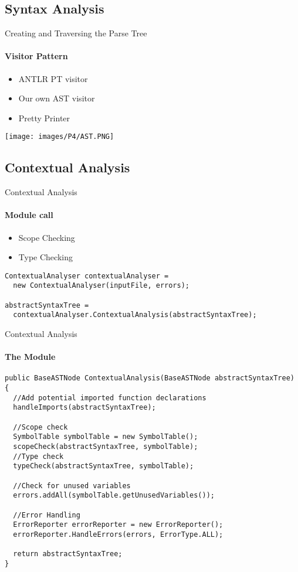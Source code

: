 \subsection{Syntax Analysis}
\begin{frame}{Creating and Traversing the Parse Tree}
\framesubtitle{Visitor Pattern}
	\begin{itemize}
        \item ANTLR PT visitor
        \item Our own AST visitor
        \item Pretty Printer
    \end{itemize}
    \texttt{[image: images/P4/AST.PNG]}

\end{frame}

\subsection{Contextual Analysis}
\begin{frame}[fragile,t]{Contextual Analysis}
\framesubtitle{Module call}
\begin{itemize}
  \item Scope Checking
  \item Type Checking
\end{itemize}
\begin{lstlisting}[caption=The creation of an instance of the Contextual analysis module and the call invoking it. ,frame=tlrb, basicstyle=\tiny, numbers=none]
ContextualAnalyser contextualAnalyser = 
  new ContextualAnalyser(inputFile, errors);

abstractSyntaxTree = 
  contextualAnalyser.ContextualAnalysis(abstractSyntaxTree);
\end{lstlisting}


\end{frame}
\begin{frame}[fragile,t]{Contextual Analysis}

\framesubtitle{The Module}

\begin{lstlisting}[caption=The method called from main performing Scope and Type checking and also reporting errors. ,frame=tlrb, basicstyle=\tiny, numbers=none ]
public BaseASTNode ContextualAnalysis(BaseASTNode abstractSyntaxTree) {
  //Add potential imported function declarations
  handleImports(abstractSyntaxTree);

  //Scope check
  SymbolTable symbolTable = new SymbolTable();
  scopeCheck(abstractSyntaxTree, symbolTable);
  //Type check
  typeCheck(abstractSyntaxTree, symbolTable);

  //Check for unused variables
  errors.addAll(symbolTable.getUnusedVariables());

  //Error Handling
  ErrorReporter errorReporter = new ErrorReporter();
  errorReporter.HandleErrors(errors, ErrorType.ALL);

  return abstractSyntaxTree;
}
\end{lstlisting}
\end{frame}

